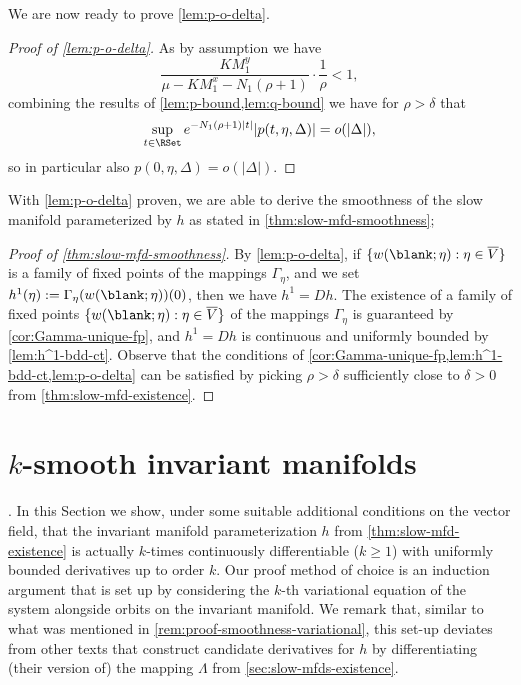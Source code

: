 \documentclass[a4paper]{siamart190516}
\begin{document}
 We are now ready to prove \cref{lem:p-o-delta}.

\begin{proof}[Proof of \cref{lem:p-o-delta}]
As by assumption we have 
\[
\frac{K M^y_1}{\mu-K M^x_1-N_1(\rho+1)} \cdot \frac{1}{\rho}  < 1,
\]
combining the results of \cref{lem:p-bound,lem:q-bound} we have for $\rho > \delta$ that
  \[
  \sup_{t \in \RSet} e^{-N_1 (\rho +1)|t|}  |p(t,\eta,\Delta)| = o(|\Delta|),
  \]
 so in particular also $p(0,\eta,\Delta) = o(|\Delta|)$.
 \end{proof}
 
 With \cref{lem:p-o-delta} proven, we are able to derive the smoothness of the slow
 manifold parameterized by $h$ as stated in \cref{thm:slow-mfd-smoothness};
 
 \begin{proof}[Proof of \cref{thm:slow-mfd-smoothness}]
 By \cref{lem:p-o-delta}, if $\{ w(\blank; \eta) : \eta \in \overline{V} \}$ is a
 family of fixed points of the mappings $\Gamma_{\eta}$, and we set $h^1(\eta) :=
 \Gamma_{\eta}(w(\blank; \eta))(0)$, then we have $h^1 = Dh$. The existence of a
 family of fixed points $\{ w(\blank; \eta) : \eta \in \overline{V} \}$ of the
 mappings $\Gamma_{\eta}$ is guaranteed by \cref{cor:Gamma-unique-fp}, and $h^1 = Dh$
 is continuous and uniformly bounded by \cref{lem:h^1-bdd-ct}. Observe that the
 conditions of \cref{cor:Gamma-unique-fp,lem:h^1-bdd-ct,lem:p-o-delta} can be
 satisfied by picking $\rho > \delta$ sufficiently close to $\delta > 0$ from \cref{thm:slow-mfd-existence}.
 \end{proof}
 
 
 \section{$k$-smooth invariant manifolds}\label{sec:k-smooth-slow-mfds}.
In this Section we show, under some suitable additional conditions on the vector
field, that the invariant manifold parameterization $h$ from \cref{thm:slow-mfd-existence} is actually $k$-times continuously differentiable 
($k \geq 1$) with uniformly bounded derivatives up to order $k$. Our proof method of
choice is an induction argument that is set up by considering the $k$-th variational
equation of the system alongside orbits on the invariant manifold. We remark that, similar
to what was mentioned in \cref{rem:proof-smoothness-variational},  this set-up
deviates from other texts that construct candidate derivatives for $h$ by
differentiating (their version of) the mapping $\Lambda$ from \cref{sec:slow-mfds-existence}.
\end{document}
